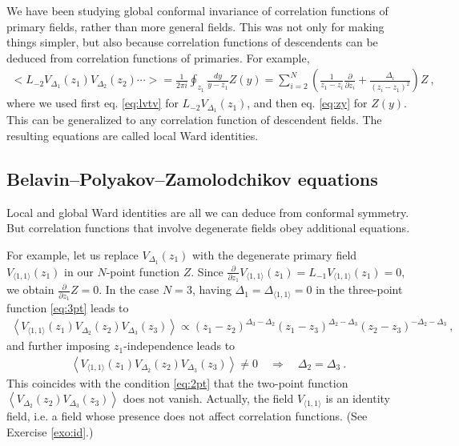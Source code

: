 \documentclass[12pt, a4paper]{article}
\theoremstyle{break}
\begin{document}
We have been studying global conformal invariance of correlation functions of primary fields, rather than more general fields. This was not only for making things simpler, but also because correlation functions of descendents can be deduced from correlation functions of primaries. For example,
\begin{align}
 \Big< L_{-2}V_{\Delta_1}(z_1) V_{\Delta_2}(z_2)\cdots \Big>
  = \frac{1}{2\pi i}\oint_{z_1} \frac{dy}{y-z_1} Z(y)
  =\sum_{i=2}^N\left(\frac{1}{z_1-z_i}\frac{\partial}{\partial z_i} +\frac{\Delta_i}{(z_i-z_1)^2}\right) Z\ ,
  \label{eq:ltv}
\end{align}
where we used first eq. \eqref{eq:lvtv} for $L_{-2}V_{\Delta_1}(z_1)$, and then eq. \eqref{eq:zy} for $Z(y)$.
This can be generalized to any correlation function of descendent fields. The resulting equations are called local Ward identities.


\subsection{Belavin--Polyakov--Zamolodchikov equations}

Local and global Ward identities are all we can deduce from conformal symmetry. But correlation functions that involve degenerate fields obey additional equations. 

For example, let us replace $V_{\Delta_1}(z_1)$ with the degenerate primary field $V_{\langle 1, 1 \rangle}(z_1)$
in our $N$-point function $Z$. Since $\frac{\partial}{\partial z_1} V_{\langle 1, 1 \rangle}(z_1) = L_{-1} V_{\langle 1, 1 \rangle}(z_1) =0$,
we obtain $\frac{\partial}{\partial z_1} Z =0$. 
In the case $N=3$, having $\Delta_1=\Delta_{\langle 1,1\rangle}=0$ in the three-point function \eqref{eq:3pt} leads to
\begin{align}
 \left< V_{\langle 1, 1 \rangle}(z_1) V_{\Delta_2}(z_2) V_{\Delta_3}(z_3) \right> \propto (z_1-z_2)^{\Delta_3-\Delta_2} (z_1-z_3)^{\Delta_2-\Delta_3} (z_2-z_3)^{-\Delta_2-\Delta_3}\ , 
\end{align}
and further imposing $z_1$-independence leads to 
\begin{align}
 \left< V_{\langle 1, 1 \rangle}(z_1) V_{\Delta_2}(z_2) V_{\Delta_3}(z_3) \right> \neq 0 \quad \Rightarrow \quad \Delta_2=\Delta_3\ .
 \label{eq:vvvnz}
\end{align}
This coincides with the condition \eqref{eq:2pt} that the two-point function $\left<V_{\Delta_2}(z_2)V_{\Delta_3}(z_3)\right>$ does not vanish. Actually, the field $V_{\langle 1,1\rangle}$ is an identity field, i.e. a field whose presence does not affect correlation functions. (See Exercise \ref{exo:id}.)
\end{document}
